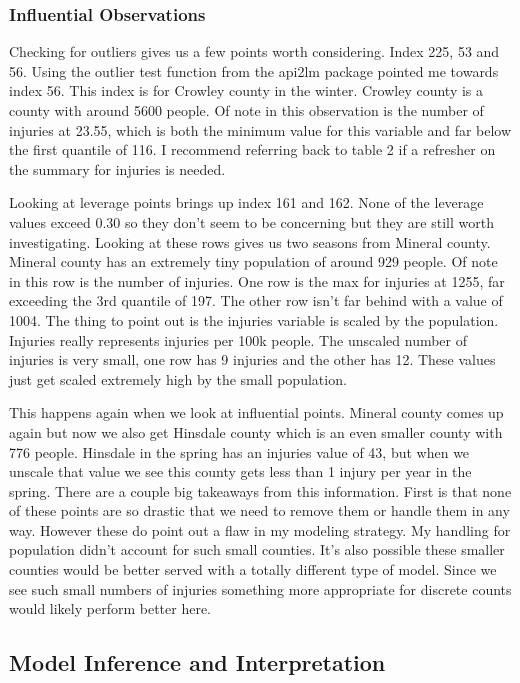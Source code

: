\subsubsection*{Influential Observations}



Checking for outliers gives us a few points worth considering. Index 225, 53 and 56. Using the outlier test function from the api2lm package pointed me towards index 56. This index is for Crowley county in the winter. Crowley county is a county with around 5600 people. Of note in this observation is the number of injuries at 23.55, which is both the minimum value for this variable and far below the first quantile of 116. I recommend referring back to table 2 if a refresher on the summary for injuries is needed.

Looking at leverage points brings up index 161 and 162. None of the leverage values exceed 0.30 so they don't seem to be concerning but they are still worth investigating. Looking at these rows gives us two seasons from Mineral county. Mineral county has an extremely tiny population of around 929 people. Of note in this row is the number of injuries. One row is the max for injuries at 1255, far exceeding the 3rd quantile of 197. The other row isn't far behind with a value of 1004. The thing to point out is the injuries variable is scaled by the population. Injuries really represents injuries per 100k people. The unscaled number of injuries is very small, one row has 9 injuries and the other has 12. These values just get scaled extremely high by the small population.

This happens again when we look at influential points. Mineral county comes up again but now we also get Hinsdale county which is an even smaller county with 776 people. Hinsdale in the spring has an injuries value of 43, but when we unscale that value we see this county gets less than 1 injury per year in the spring. There are a couple big takeaways from this information. First is that none of these points are so drastic that we need to remove them or handle them in any way. However these do point out a flaw in my modeling strategy. My handling for population didn't account for such small counties. It's also possible these smaller counties would be better served with a totally different type of model. Since we see such small numbers of injuries something more appropriate for discrete counts would likely perform better here.

\subsection*{Model Inference and Interpretation}

